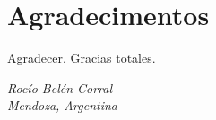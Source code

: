 \chapter*{Agradecimentos}

Agradecer. Gracias totales.







\begin{flushright}
  \textit{Rocío Belén Corral} \\
  \textit{Mendoza, Argentina} \\
  \textit{\DTMmonthname{\month} \number\year} %
\end{flushright}

